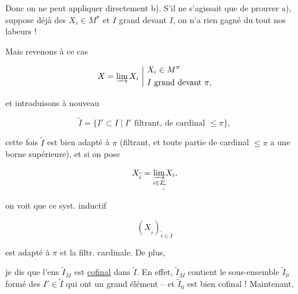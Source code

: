 
Donc on ne peut  appliquer directement b). S'il ne s'agissait que de prouver  a),  suppose déjà des $X_i\in M^\pi$ et $I$ grand devant $I$, on n'a rien gagné du tout  nos labeurs !


Mais revenons à ce cas

\[
 X=\varinjlim X_i\ \bigg|\ \begin{aligned}&X_i\in M^\pi\\&I\text{ grand devant }\pi,\end{aligned}
\]

et introduisons à nouveau

\[
 \widetilde I=\{I'\subset I\mid I'\text{ filtrant, de cardinal }\leq\pi\},
\]

 cette fois $\widetilde I$ est  bien adapté à $\pi$ (filtrant, et toute partie  de cardinal $\leq\pi$ a une borne supérieure), et si on pose

\[
 X_{\widetilde i}=\underset{i\in I'_{\widetilde i}}{\varinjlim} X_i,
\]

on voit que ce syst. inductif

\[
 (X_{\widetilde i})_{\widetilde i\in\widetilde I}
\]

est  adapté à $\pi$ et la filtr. cardinale. De plus, 


 je dis que l'ens $\widetilde I_M$ est \uline{cofinal} dans $\widetilde I$. En effet,  $\widetilde I_M$ contient le sous-ensemble $\widetilde I_0$ formé des $I'\in\widetilde I$ qui ont un  grand élément -- et $\widetilde I_0$ est bien cofinal ! Maintenant,  


